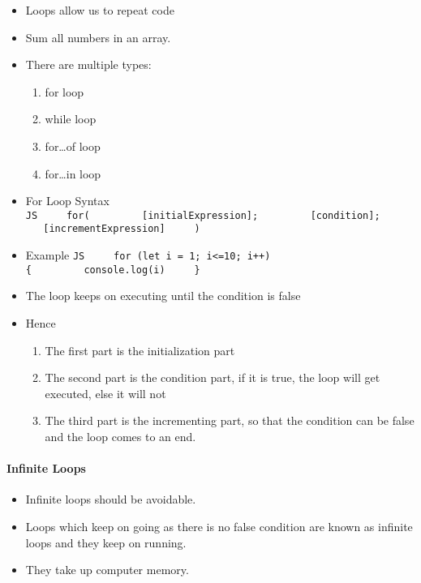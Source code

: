 \documentclass[
  paper=a4,
  ,captions=tableheading
]{scrartcl}
\providecommand{\tightlist}{%
  \setlength{\itemsep}{0pt}\setlength{\parskip}{0pt}}
\begin{document}
\begin{itemize}
\tightlist
\item
  Loops allow us to repeat code
\item
  Sum all numbers in an array.
\item
  There are multiple types:

  \begin{enumerate}
  \def\labelenumi{\arabic{enumi}.}
  \tightlist
  \item
    for loop
  \item
    while loop
  \item
    for\ldots of loop
  \item
    for\ldots in loop
  \end{enumerate}
\item
  For Loop Syntax
  \texttt{JS\ \ \ \ \ for(\ \ \ \ \ \ \ \ \ {[}initialExpression{]};\ \ \ \ \ \ \ \ \ {[}condition{]};\ \ \ \ \ \ \ \ \ {[}incrementExpression{]}\ \ \ \ \ )}
\item
  Example
  \texttt{JS\ \ \ \ \ for\ (let\ i\ =\ 1;\ i\textless{}=10;\ i++)\{\ \ \ \ \ \ \ \ \ console.log(i)\ \ \ \ \ \}}
\item
  The loop keeps on executing until the condition is false
\item
  Hence

  \begin{enumerate}
  \def\labelenumi{\arabic{enumi}.}
  \tightlist
  \item
    The first part is the initialization part
  \item
    The second part is the condition part, if it is true, the loop will
    get executed, else it will not
  \item
    The third part is the incrementing part, so that the condition can
    be false and the loop comes to an end.
  \end{enumerate}
\end{itemize}

\hypertarget{infinite-loops}{%
\paragraph{Infinite Loops}\label{infinite-loops}}

\begin{itemize}
\tightlist
\item
  Infinite loops should be avoidable.
\item
  Loops which keep on going as there is no false condition are known as
  infinite loops and they keep on running.
\item
  They take up computer memory.
\end{itemize}
\end{document}

